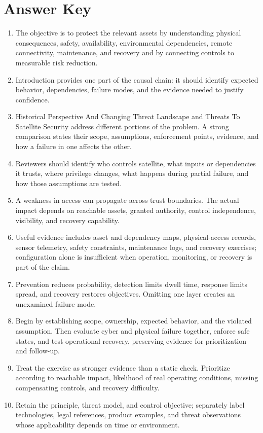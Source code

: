 \documentclass[11pt]{article}
\begin{document}
\section*{Answer Key}
\begin{enumerate}
\item The objective is to protect the relevant assets by understanding physical consequences, safety, availability, environmental dependencies, remote connectivity, maintenance, and recovery and by connecting controls to measurable risk reduction.
\item Introduction provides one part of the causal chain: it should identify expected behavior, dependencies, failure modes, and the evidence needed to justify confidence.
\item Historical Perspective And Changing Threat Landscape and Threats To Satellite Security address different portions of the problem. A strong comparison states their scope, assumptions, enforcement points, evidence, and how a failure in one affects the other.
\item Reviewers should identify who controls satellite, what inputs or dependencies it trusts, where privilege changes, what happens during partial failure, and how those assumptions are tested.
\item A weakness in access can propagate across trust boundaries. The actual impact depends on reachable assets, granted authority, control independence, visibility, and recovery capability.
\item Useful evidence includes asset and dependency maps, physical-access records, sensor telemetry, safety constraints, maintenance logs, and recovery exercises; configuration alone is insufficient when operation, monitoring, or recovery is part of the claim.
\item Prevention reduces probability, detection limits dwell time, response limits spread, and recovery restores objectives. Omitting one layer creates an unexamined failure mode.
\item Begin by establishing scope, ownership, expected behavior, and the violated assumption. Then evaluate cyber and physical failure together, enforce safe states, and test operational recovery, preserving evidence for prioritization and follow-up.
\item Treat the exercise as stronger evidence than a static check. Prioritize according to reachable impact, likelihood of real operating conditions, missing compensating controls, and recovery difficulty.
\item Retain the principle, threat model, and control objective; separately label technologies, legal references, product examples, and threat observations whose applicability depends on time or environment.
\end{enumerate}
\end{document}
